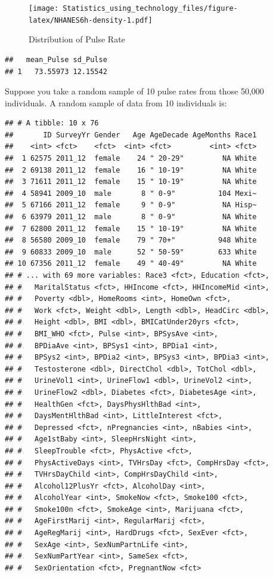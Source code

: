 \documentclass[
]{book}
\newenvironment{Shaded}{\begin{snugshade}}{\end{snugshade}}
\newcommand{\DataTypeTok}[1]{\textcolor[rgb]{0.13,0.29,0.53}{#1}}
\newcommand{\DecValTok}[1]{\textcolor[rgb]{0.00,0.00,0.81}{#1}}
\newcommand{\KeywordTok}[1]{\textcolor[rgb]{0.13,0.29,0.53}{\textbf{#1}}}
\newcommand{\NormalTok}[1]{#1}
\newcommand{\OperatorTok}[1]{\textcolor[rgb]{0.81,0.36,0.00}{\textbf{#1}}}
\newcommand{\StringTok}[1]{\textcolor[rgb]{0.31,0.60,0.02}{#1}}
\begin{document}
\begin{figure}
\centering
\texttt{[image: Statistics\_using\_technology\_files/figure-latex/NHANES6h-density-1.pdf]}
\caption{\label{fig:NHANES6h-density}Distribution of Pulse Rate}
\end{figure}

\begin{verbatim}
##   mean_Pulse sd_Pulse
## 1   73.55973 12.15542
\end{verbatim}

Suppose you take a random sample of 10 pulse rates from those 50,000 individuals. A random sample of data from 10 individuals is:

\begin{Shaded}
\end{Shaded}

\begin{verbatim}
## # A tibble: 10 x 76
##       ID SurveyYr Gender   Age AgeDecade AgeMonths Race1
##    <int> <fct>    <fct>  <int> <fct>         <int> <fct>
##  1 62575 2011_12  female    24 " 20-29"         NA White
##  2 69138 2011_12  female    16 " 10-19"         NA White
##  3 71611 2011_12  female    15 " 10-19"         NA White
##  4 58941 2009_10  male       8 " 0-9"          104 Mexi~
##  5 67166 2011_12  female     9 " 0-9"           NA Hisp~
##  6 63979 2011_12  male       8 " 0-9"           NA White
##  7 62800 2011_12  female    15 " 10-19"         NA White
##  8 56580 2009_10  female    79 " 70+"          948 White
##  9 60833 2009_10  male      52 " 50-59"        633 White
## 10 67356 2011_12  female    49 " 40-49"         NA White
## # ... with 69 more variables: Race3 <fct>, Education <fct>,
## #   MaritalStatus <fct>, HHIncome <fct>, HHIncomeMid <int>,
## #   Poverty <dbl>, HomeRooms <int>, HomeOwn <fct>,
## #   Work <fct>, Weight <dbl>, Length <dbl>, HeadCirc <dbl>,
## #   Height <dbl>, BMI <dbl>, BMICatUnder20yrs <fct>,
## #   BMI_WHO <fct>, Pulse <int>, BPSysAve <int>,
## #   BPDiaAve <int>, BPSys1 <int>, BPDia1 <int>,
## #   BPSys2 <int>, BPDia2 <int>, BPSys3 <int>, BPDia3 <int>,
## #   Testosterone <dbl>, DirectChol <dbl>, TotChol <dbl>,
## #   UrineVol1 <int>, UrineFlow1 <dbl>, UrineVol2 <int>,
## #   UrineFlow2 <dbl>, Diabetes <fct>, DiabetesAge <int>,
## #   HealthGen <fct>, DaysPhysHlthBad <int>,
## #   DaysMentHlthBad <int>, LittleInterest <fct>,
## #   Depressed <fct>, nPregnancies <int>, nBabies <int>,
## #   Age1stBaby <int>, SleepHrsNight <int>,
## #   SleepTrouble <fct>, PhysActive <fct>,
## #   PhysActiveDays <int>, TVHrsDay <fct>, CompHrsDay <fct>,
## #   TVHrsDayChild <int>, CompHrsDayChild <int>,
## #   Alcohol12PlusYr <fct>, AlcoholDay <int>,
## #   AlcoholYear <int>, SmokeNow <fct>, Smoke100 <fct>,
## #   Smoke100n <fct>, SmokeAge <int>, Marijuana <fct>,
## #   AgeFirstMarij <int>, RegularMarij <fct>,
## #   AgeRegMarij <int>, HardDrugs <fct>, SexEver <fct>,
## #   SexAge <int>, SexNumPartnLife <int>,
## #   SexNumPartYear <int>, SameSex <fct>,
## #   SexOrientation <fct>, PregnantNow <fct>
\end{verbatim}
\end{document}
